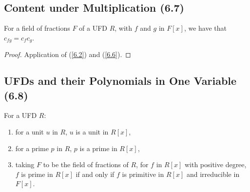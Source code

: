 \subsection{Content under Multiplication (6.7)} \label{6.7}

For a field of fractions $F$ of a UFD $R$, with $f$ and $g$ in $F[x]$, we have that
$c_{fg} = c_fc_g$.

\begin{proof}
    Application of (\ref{6.2}) and (\ref{6.6}).
\end{proof}

\subsection{UFDs and their Polynomials in One Variable (6.8)} \label{6.8}

For a UFD $R$: \begin{enumerate}
    \item for a unit $u$ in $R$, $u$ is a unit in $R[x]$,
    \item for a prime $p$ in $R$, $p$ is a prime in $R[x]$,
    \item taking $F$ to be the field of fractions of $R$, for $f$ in $R[x]$
        with positive degree, $f$ is prime in $R[x]$ if and only if $f$ is
        primitive in $R[x]$ and irreducible in $F[x]$.
\end{enumerate}


